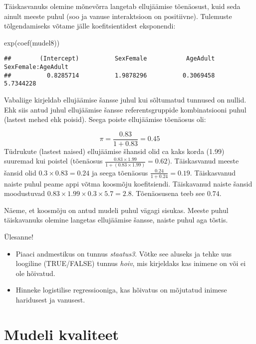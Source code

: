 \documentclass[
]{book}
\newenvironment{Shaded}{\begin{snugshade}}{\end{snugshade}}
\newcommand{\FunctionTok}[1]{\textcolor[rgb]{0.00,0.00,0.00}{#1}}
\newcommand{\NormalTok}[1]{#1}
\providecommand{\tightlist}{%
  \setlength{\itemsep}{0pt}\setlength{\parskip}{0pt}}
\begin{document}
Täiskasvanuks olemine mõnevõrra langetab ellujäämise tõenäosust, kuid seda ainult meeste puhul (soo ja vanuse interaktsioon on positiivne). Tulemuste tõlgendamiseks võtame jälle koefitsientidest eksponendi:

\begin{Shaded}
\begin{Highlighting}[]
\FunctionTok{exp}\NormalTok{(}\FunctionTok{coef}\NormalTok{(mudel8))}
\end{Highlighting}
\end{Shaded}

\begin{verbatim}
##        (Intercept)          SexFemale           AgeAdult SexFemale:AgeAdult 
##          0.8285714          1.9878296          0.3069458          5.7344228
\end{verbatim}

Vabaliige kirjeldab ellujäämise šansse juhul kui sõltumatud tunnused on nullid. Ehk siis antud juhul ellujäämise šansse referentsgruppide kombinatsiooni puhul (lastest mehed ehk poisid). Seega poiste ellujäämise tõenäosus oli:

\[\pi = \frac{0.83}{1+0.83} = 0.45\]
Tüdrukute (lastest naised) ellujäämise šhansid olid ca kaks korda (1.99) suuremad kui poistel (tõenäosus \(\frac{0.83\times1.99}{1+(0.83\times1.99)} = 0.62\)). Täiskasvanud meeste šansid olid \(0.3\times0.83 = 0.24\) ja seega tõenäosus \(\frac{0.24}{1+0.24} = 0.19\). Täiskasvanud naiste puhul peame appi võtma koosmõju koefitsiendi. Täiskavanud naiste šansid moodustuvad \(0.83\times1.99\times0.3\times5.7 = 2.8\). Tõenäosusena teeb see \(0.74\).

Näeme, et koosmõju on antud mudeli puhul vägagi sisukas. Meeste puhul täiskavanuks olemine langetas ellujäämise šansse, naiste puhul aga tõstis.

Ülesanne!

\begin{itemize}
\tightlist
\item
  Piaaci andmestikus on tunnus \emph{staatus3}. Võtke see aluseks ja tehke uus loogiline (TRUE/FALSE) tunnus \emph{hoiv}, mis kirjeldaks kas inimene on või ei ole hõivatud.\\
\item
  Hinneke logistilise regressiooniga, kas hõivatus on mõjutatud inimese haridusest ja vanusest.
\end{itemize}

\hypertarget{mudeli-kvaliteet}{%
\section{Mudeli kvaliteet}\label{mudeli-kvaliteet}}
\end{document}
